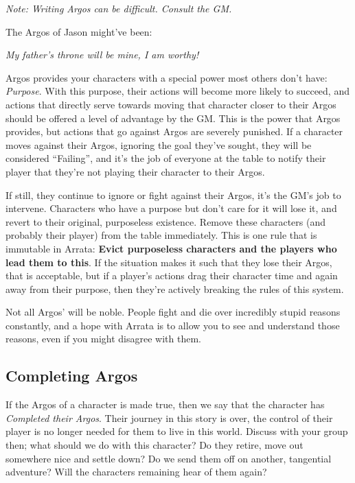 \documentclass[../main.tex]{subfiles}
\begin{document}
        \emph{Note: Writing Argos can be difficult. Consult the GM.}
        \begin{mdframed}[style=Arrata]
            The Argos of Jason might've been: 

            \begin{center}
                \emph{My father's throne will be mine, I am worthy!}
            \end{center}
        \end{mdframed}

        Argos provides your characters with a special power most others don't have: \emph{Purpose}. With this purpose, their actions will become more likely to succeed, and actions that directly serve towards moving that character closer to their Argos should be offered a level of advantage by the GM. This is the power that Argos provides, but actions that go against Argos are severely punished. If a character moves against their Argos, ignoring the goal they've sought, they will be considered ``Failing'', and it's the job of everyone at the table to notify their player that they're not playing their character to their Argos.

        If still, they continue to ignore or fight against their Argos, it's the GM's job to intervene. Characters who have a purpose but don't care for it will lose it, and revert to their original, purposeless existence. Remove these characters (and probably their player) from the table immediately. This is one rule that is immutable in Arrata: \textbf{Evict purposeless characters and the players who lead them to this}. If the situation makes it such that they lose their Argos, that is acceptable, but if a player's actions drag their character time and again away from their purpose, then they're actively breaking the rules of this system.

        Not all Argos' will be noble. People fight and die over incredibly stupid reasons constantly, and a hope with Arrata is to allow you to see and understand those reasons, even if you might disagree with them.

    \subsection{Completing Argos}

        If the Argos of a character is made true, then we say that the character has \emph{Completed their Argos}. Their journey in this story is over, the control of their player is no longer needed for them to live in this world. Discuss with your group then; what should we do with this character? Do they retire, move out somewhere nice and settle down? Do we send them off on another, tangential adventure? Will the characters remaining hear of them again?
\end{document}

